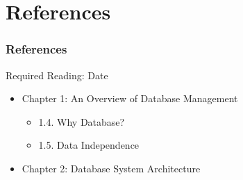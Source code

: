 \documentclass[dvipsnames]{beamer}
\theoremstyle{plain}
\begin{document}
\section*{References}

\begin{frame}
  \frametitle{References}

  \begin{block}{Required Reading: Date}
    \begin{itemize}
      \item Chapter 1: An Overview of Database Management
      \begin{itemize}
        \item 1.4. \alert{Why Database?}
        \item 1.5. \alert{Data Independence}
      \end{itemize}

      \item Chapter 2: \alert{Database System Architecture}
    \end{itemize}
  \end{block}
\end{frame}
\end{document}

